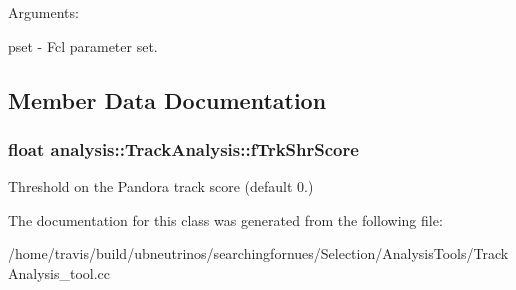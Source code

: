 Arguments\-:

pset -\/ Fcl parameter set. 

\subsection{Member Data Documentation}
\hypertarget{classanalysis_1_1TrackAnalysis_a49502213574f13be542aaab647940ffd}{
\subsubsection[{f\-Trk\-Shr\-Score}]{\setlength{\rightskip}{0pt plus 5cm}float analysis\-::\-Track\-Analysis\-::f\-Trk\-Shr\-Score\hspace{0.3cm}{\ttfamily [private]}}}\label{classanalysis_1_1TrackAnalysis_a49502213574f13be542aaab647940ffd}
Threshold on the Pandora track score (default 0.) 

The documentation for this class was generated from the following file\-:\begin{DoxyCompactItemize}
\item 
/home/travis/build/ubneutrinos/searchingfornues/\-Selection/\-Analysis\-Tools/Track\-Analysis\-\_\-tool.\-cc\end{DoxyCompactItemize}
